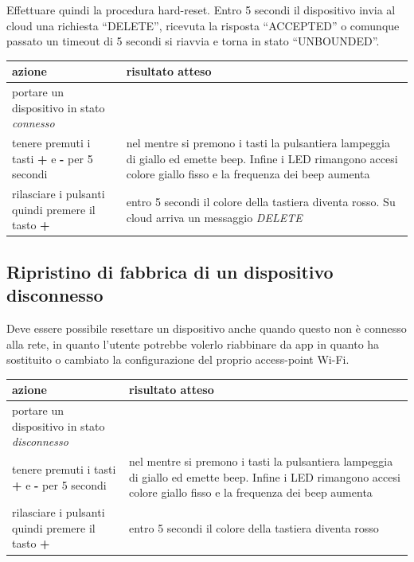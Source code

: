 \documentclass[12pt,a4paper,twoside,titlepage]{book}
\begin{document}
Effettuare quindi la procedura hard-reset. Entro 5 secondi il dispositivo invia al cloud una richiesta “DELETE”, ricevuta la risposta “ACCEPTED” o comunque passato un timeout di 5 secondi si riavvia e torna in stato “UNBOUNDED”.
\begin{center}
\begin{tabular}{| p{5cm} | p{5cm} |}
    \hline \textbf{azione} & \textbf{risultato atteso} \\
    \hline portare un dispositivo in stato \textit{connesso} & \\
    \hline tenere premuti i tasti \textbf{+} e \textbf{-} per 5 secondi & nel mentre si premono i tasti la pulsantiera lampeggia di giallo ed emette beep. Infine i LED rimangono accesi colore giallo fisso e la frequenza dei beep aumenta \\
    \hline rilasciare i pulsanti quindi premere il tasto \textbf{+} & entro 5 secondi il colore della tastiera diventa rosso. Su cloud arriva un messaggio \textit{DELETE} \\
    \hline
\end{tabular}
\end{center}

\subsection{Ripristino di fabbrica di un dispositivo disconnesso}

Deve essere possibile resettare un dispositivo anche quando questo non è connesso
alla rete, in quanto l'utente potrebbe volerlo riabbinare da app in quanto ha sostituito
o cambiato la configurazione del proprio access-point Wi-Fi.

\begin{center}
\begin{tabular}{| p{5cm} | p{5cm} |}
    \hline \textbf{azione} & \textbf{risultato atteso} \\
    \hline portare un dispositivo in stato \textit{disconnesso} & \\
    \hline tenere premuti i tasti \textbf{+} e \textbf{-} per 5 secondi & nel mentre si premono i tasti la pulsantiera lampeggia di giallo ed emette beep. Infine i LED rimangono accesi colore giallo fisso e la frequenza dei beep aumenta \\
    \hline rilasciare i pulsanti quindi premere il tasto \textbf{+} & entro 5 secondi il colore della tastiera diventa rosso \\
    \hline
\end{tabular}
\end{center}
\end{document}
